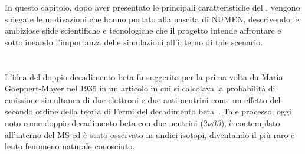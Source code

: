 In questo capitolo, dopo aver presentato le principali caratteristiche del \doppiobeta{}, vengono spiegate le motivazioni che hanno portato alla nascita di NUMEN, descrivendo le ambiziose sfide scientifiche e tecnologiche che il progetto intende affrontare e sottolineando l'importanza delle simulazioni all'interno di tale scenario.




\section{} \label{sez:doppio_beta_senza_neutrini}

L'idea del doppio decadimento beta fu suggerita per la prima volta da Maria Goeppert-Mayer nel 1935 in un articolo in cui si calcolava la probabilità di emissione simultanea di due elettroni e due anti-neutrini come un effetto del secondo ordine della teoria di Fermi del decadimento beta~\cite{goeppert-mayer:pr35}. 
Tale processo, oggi noto come doppio decadimento beta con due neutrini ($ 2\nu\beta\beta $), è contemplato all'interno del MS ed è stato osservato in undici isotopi, diventando il più raro e lento fenomeno naturale conosciuto.
 



